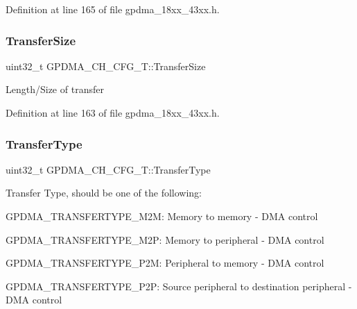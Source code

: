 Definition at line 165 of file gpdma\+\_\+18xx\+\_\+43xx.\+h.

\mbox{\label{struct_g_p_d_m_a___c_h___c_f_g___t_a5666efb9edb055974b590443ea45ed7b}} 
\subsubsection{\texorpdfstring{Transfer\+Size}{TransferSize}}
{\footnotesize\ttfamily uint32\+\_\+t G\+P\+D\+M\+A\+\_\+\+C\+H\+\_\+\+C\+F\+G\+\_\+\+T\+::\+Transfer\+Size}

Length/\+Size of transfer 

Definition at line 163 of file gpdma\+\_\+18xx\+\_\+43xx.\+h.

\mbox{\label{struct_g_p_d_m_a___c_h___c_f_g___t_a6c21f3fe48e5e23443a324f9a42a3886}} 
\subsubsection{\texorpdfstring{Transfer\+Type}{TransferType}}
{\footnotesize\ttfamily uint32\+\_\+t G\+P\+D\+M\+A\+\_\+\+C\+H\+\_\+\+C\+F\+G\+\_\+\+T\+::\+Transfer\+Type}

Transfer Type, should be one of the following\+:
\begin{DoxyItemize}
\item G\+P\+D\+M\+A\+\_\+\+T\+R\+A\+N\+S\+F\+E\+R\+T\+Y\+P\+E\+\_\+\+M2M\+: Memory to memory -\/ D\+MA control
\item G\+P\+D\+M\+A\+\_\+\+T\+R\+A\+N\+S\+F\+E\+R\+T\+Y\+P\+E\+\_\+\+M2P\+: Memory to peripheral -\/ D\+MA control
\item G\+P\+D\+M\+A\+\_\+\+T\+R\+A\+N\+S\+F\+E\+R\+T\+Y\+P\+E\+\_\+\+P2M\+: Peripheral to memory -\/ D\+MA control
\item G\+P\+D\+M\+A\+\_\+\+T\+R\+A\+N\+S\+F\+E\+R\+T\+Y\+P\+E\+\_\+\+P2P\+: Source peripheral to destination peripheral -\/ D\+MA control 
\end{DoxyItemize}

